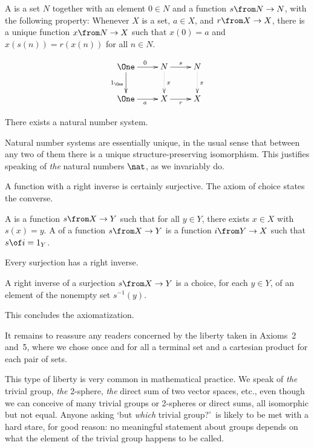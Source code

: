 \documentclass[12pt]{article}
\begin{document}
\begin{dfn}
A  is a set $N$ together with an
element $0 \in N$ and a function $s\from N \to N$, with the
following property:
\medskip\noindent
Whenever $X$ is a set, $a \in X$, and $r\from X \to X$,
there is a unique function $x\from N \to X$ such that
$x(0) = a$
and 
$x(s(n)) = r(x(n))$ for all $n \in N$.
\end{dfn}
\[
\xymatrix{
\One \ar[r]^0 \ar[d]_{1_{\One}} &N \ar[r]^s \ar@{.>}[d]^x
                                                &N \ar@{.>}[d]^x        \\
\One \ar[r]_a                   &X \ar[r]_r     &X
}
\]
% 
\begin{axiom}
There exists a natural number system.
\end{axiom}
Natural number systems are essentially unique, in the usual sense that
between any two of them there is a unique structure-preserving isomorphism.
This justifies speaking of \emph{the} natural numbers $\nat$, as we
invariably do.


% 
A function with a right inverse is certainly surjective.  The axiom of
choice states the converse.

\begin{dfn}
A  is a function $s \from X \to Y$ such that for all $y
\in Y$, there exists $x \in X$ with $s(x) = y$. A  of a function $s\from X \to Y$ is a function
$i\from Y \to X$ such that $s \of i = 1_Y$.
\end{dfn}

\begin{axiom}
Every surjection has a right inverse.
\end{axiom}

A right inverse of a surjection $s\from X \to Y$ is a choice, for each $y \in
Y$, of an element of the nonempty set $s^{-1}(y)$.  

This concludes the axiomatization.


It remains to reassure any readers concerned by the liberty taken in
Axioms~2 and~5, where we chose once and for all a terminal set and a
cartesian product for each pair of sets.

This type of liberty is very common in mathematical practice.  We speak of
\emph{the} trivial group, \emph{the} 2-sphere, \emph{the} direct sum of two
vector spaces, etc., even though we can conceive of many trivial groups or
2-spheres or direct sums, all isomorphic but not equal.  Anyone asking `but
\emph{which} trivial group?'\ is likely to be met with a hard stare, for
good reason: no meaningful statement about groups depends on what the
element of the trivial group happens to be called.
\end{document}
